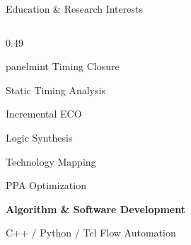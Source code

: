 \documentclass[aspectratio=169,10pt]{beamer}
\begin{document}
\begin{frame}[label=summary-2]{Education \& Research Interests}
\begin{columns}[T,onlytextwidth]
\begin{column}{0.49\textwidth}
\begin{beamercolorbox}[rounded=true,sep=0.20cm,wd=\linewidth]{panelmint}
        {\normalsize Timing Closure}\par
        {\normalsize Static Timing Analysis}\par
        {\normalsize Incremental ECO}\par
        {\normalsize Logic Synthesis}\par
        {\normalsize Technology Mapping}\par
        {\normalsize PPA Optimization}\par
        \vspace{0.15cm}
        {\normalsize\bfseries Algorithm \& Software Development}\par
        \vspace{0.09cm}
        {\normalsize C++ / Python / Tcl Flow Automation}\par
      \end{beamercolorbox}
    \end{column}
  \end{columns}
  \vfill
\end{frame}
\end{document}

